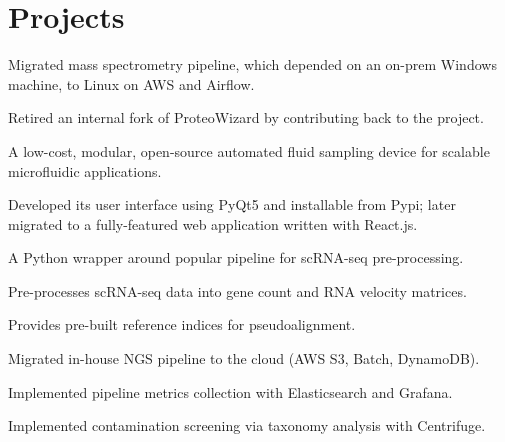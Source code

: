 \documentclass[]{resume}
\begin{document}
\begin{minipage}[t]{0.69\textwidth}


\section{Projects}
\vspace{\topsep} %
\begin{tightemize}
\item {Migrated mass spectrometry pipeline, which depended on an on-prem Windows machine, to Linux on AWS and Airflow.}
\item {Retired an internal fork of ProteoWizard by contributing back to the project.}
\end{tightemize}
\sectionsep

\begin{tightemize}
\item {A low-cost, modular, open-source automated fluid sampling device for scalable microfluidic applications.}
\item {Developed its user interface using PyQt5 and installable from Pypi; later migrated to a fully-featured web application written with React.js.}
\end{tightemize}
\sectionsep

\begin{tightemize}
\item A Python wrapper around popular pipeline for scRNA-seq pre-processing.
\item Pre-processes scRNA-seq data into gene count and RNA velocity matrices.
\item Provides pre-built reference indices for pseudoalignment.
\end{tightemize}
\sectionsep

\begin{tightemize}
\item Migrated in-house NGS pipeline to the cloud (AWS S3, Batch, DynamoDB).
\item Implemented pipeline metrics collection with Elasticsearch and Grafana.
\item Implemented contamination screening via taxonomy analysis with Centrifuge.
\end{tightemize}
\sectionsep


\end{minipage}
\end{document}
